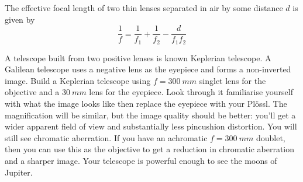 \documentclass[a4paper]{report}
\begin{document}
The effective focal length of two thin lenses separated in air by some distance $d$ is given by
\begin{equation}
\frac{1}{f} = \frac{1}{f_1} + \frac{1}{f_2} - \frac{d}{f_1f_2}
\label{eq:compoundLensF}
\end{equation}

A telescope built from two positive lenses is known Keplerian telescope. 
A Galilean telescope uses a negative lens as the eyepiece and forms a non-inverted image.
Build a Keplerian telescope using $f=300~mm$ singlet lens for the objective and a $30~mm$ lens for the eyepiece. 
Look through it familiarise yourself with what the image looks like then replace the eyepiece with your Pl\"{o}ssl. 
The magnification will be similar, but the image quality should be better: you'll get a wider apparent field of view and substantially less pincushion distortion. 
You will still see chromatic aberration. 
If you have an achromatic $f=300~mm$ doublet, then you can use this as the objective to get a reduction in chromatic aberration and a sharper image. 
Your telescope is powerful enough to see the moons of Jupiter. 
\end{document}
